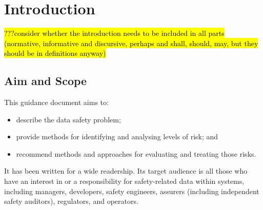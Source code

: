 %
%

%
%
\setcounter{page}{1}
\pagestyle{Standard} %
\thispagestyle{FirstPage}

\chapter{Introduction} \label{bkm:introduction}
\hl{???consider whether the introduction needs to be included in all parts (normative, informative and discursive, perhaps and shall, should, may, but they should be in definitions anyway)}

\section{Aim and Scope}
This guidance document aims to:
\begin{itemize}
	\item describe the data safety problem;
	\item provide methods for identifying and analysing levels of risk; and
	\item recommend methods and approaches for evaluating and treating those risks.
\end{itemize}

It has been written for a wide readership. Its target audience is all those who have an interest in or a responsibility for safety-related data within systems, including managers, developers, safety engineers, assurers (including independent safety auditors), regulators, and operators. 

